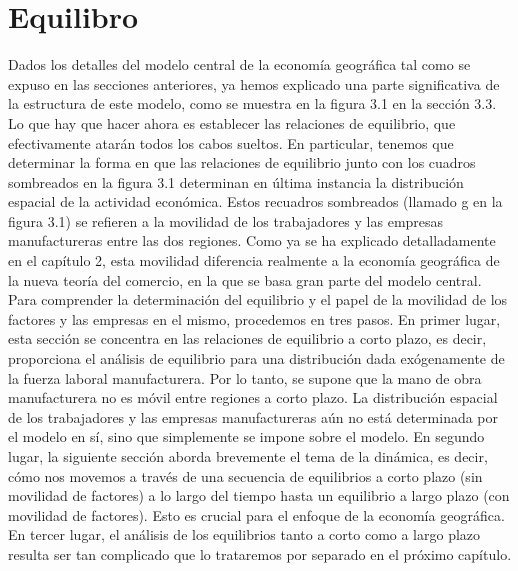 \section{Equilibro}
 Dados los detalles del modelo central de la economía geográfica tal como se expuso en las secciones anteriores, ya hemos explicado una parte significativa de la estructura de este modelo, como se muestra en la figura 3.1 en la sección 3.3. Lo que hay que hacer ahora es establecer las relaciones de equilibrio, que efectivamente atarán todos los cabos sueltos. En particular, tenemos que determinar la forma en que las relaciones de equilibrio junto con los cuadros sombreados en la figura 3.1 determinan en última instancia la distribución espacial de la actividad económica. Estos recuadros sombreados (llamado g en la figura 3.1) se refieren a la movilidad de los trabajadores y las empresas manufactureras entre las dos regiones. Como ya se ha explicado detalladamente en el capítulo 2, esta movilidad diferencia realmente a la economía geográfica de la nueva teoría del comercio, en la que se basa gran parte del modelo central.\\
 Para comprender la determinación del equilibrio y el papel de la movilidad de los factores y las empresas en el mismo, procedemos en tres pasos. En primer lugar, esta sección se concentra en las relaciones de equilibrio a corto plazo, es decir, proporciona el análisis de equilibrio para una distribución dada exógenamente de la fuerza laboral manufacturera. Por lo tanto, se supone que la mano de obra manufacturera no es móvil entre regiones a corto plazo. La distribución espacial de los trabajadores y las empresas manufactureras aún no está determinada por el modelo en sí, sino que simplemente se impone sobre el modelo. En segundo lugar, la siguiente sección aborda brevemente el tema de la dinámica, es decir, cómo nos movemos a través de una secuencia de equilibrios a corto plazo (sin movilidad de factores) a lo largo del tiempo hasta un equilibrio a largo plazo (con movilidad de factores). Esto es crucial para el enfoque de la economía geográfica. En tercer lugar, el análisis de los equilibrios tanto a corto como a largo plazo resulta ser tan complicado que lo trataremos por separado en el próximo capítulo.

